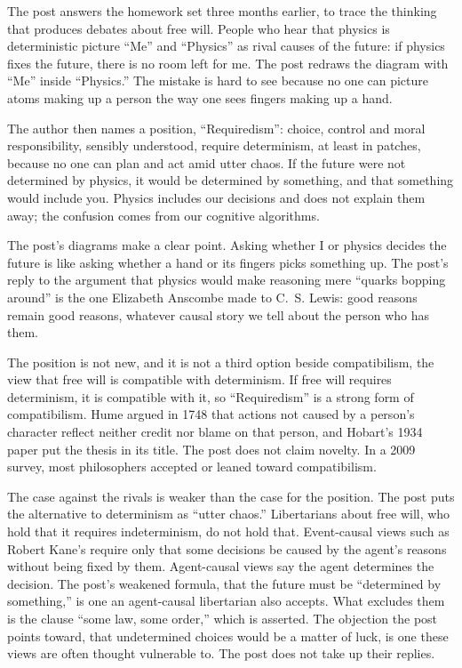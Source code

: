 \begin{afterword}
\summaryhead

The post answers the homework set three months earlier, to trace the thinking that produces debates about free will. People who hear that physics is deterministic picture ``Me'' and ``Physics'' as rival causes of the future: if physics fixes the future, there is no room left for me. The post redraws the diagram with ``Me'' inside ``Physics.'' The mistake is hard to see because no one can picture atoms making up a person the way one sees fingers making up a hand.

The author then names a position, ``Requiredism'': choice, control and moral responsibility, sensibly understood, require determinism, at least in patches, because no one can plan and act amid utter chaos. If the future were not determined by physics, it would be determined by something, and that something would include you. Physics includes our decisions and does not explain them away; the confusion comes from our cognitive algorithms.

\responsehead

The post's diagrams make a clear point. Asking whether I or physics decides the future is like asking whether a hand or its fingers picks something up. The post's reply to the argument that physics would make reasoning mere ``quarks bopping around'' is the one Elizabeth Anscombe made to C.~S. Lewis: good reasons remain good reasons, whatever causal story we tell about the person who has them.

The position is not new, and it is not a third option beside compatibilism, the view that free will is compatible with determinism. If free will requires determinism, it is compatible with it, so ``Requiredism'' is a strong form of compatibilism. Hume argued in 1748 that actions not caused by a person's character reflect neither credit nor blame on that person, and Hobart's 1934 paper put the thesis in its title. The post does not claim novelty. In a 2009 survey, most philosophers accepted or leaned toward compatibilism.

The case against the rivals is weaker than the case for the position. The post puts the alternative to determinism as ``utter chaos.'' Libertarians about free will, who hold that it requires indeterminism, do not hold that. Event-causal views such as Robert Kane's require only that some decisions be caused by the agent's reasons without being fixed by them. Agent-causal views say the agent determines the decision. The post's weakened formula, that the future must be ``determined by something,'' is one an agent-causal libertarian also accepts. What excludes them is the clause ``some law, some order,'' which is asserted. The objection the post points toward, that undetermined choices would be a matter of luck, is one these views are often thought vulnerable to. The post does not take up their replies.


\end{afterword}
